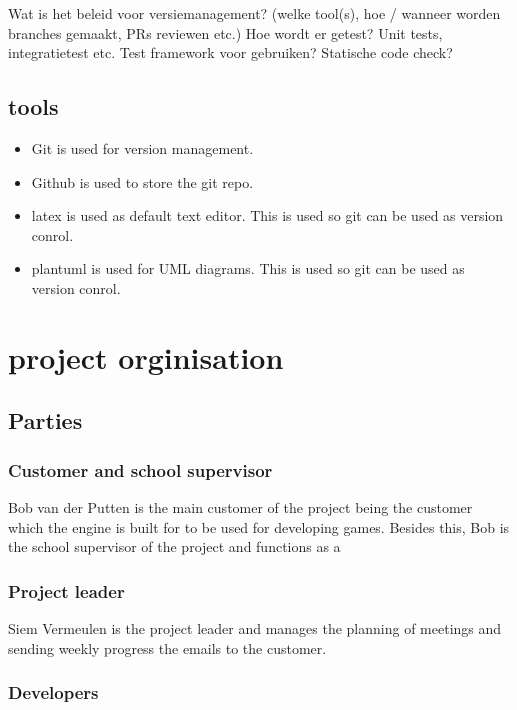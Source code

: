 \documentclass{article} %
\begin{document}
    Wat is het beleid voor versiemanagement? (welke tool(s), hoe / wanneer worden branches gemaakt, PRs reviewen etc.)
    Hoe wordt er getest? Unit tests, integratietest etc. Test framework voor gebruiken? Statische code check?
    \subsection{tools}
    \begin{itemize}
        \item Git is used for version management.
        \item Github is used to store the git repo.
        \item latex is used as default text editor. This is used so git can be used as version conrol.
        \item plantuml is used for UML diagrams. This is used so git can be used as version conrol.
        
    \end{itemize}
    \newpage

    \section{project orginisation}
    
    \subsection{Parties}
    
    \subsubsection{Customer and school supervisor}
    
    Bob van der Putten is the main customer of the project being the customer which the engine is built for to be used for developing games. Besides this, Bob is the school supervisor of the project and functions as a 
    
    \subsubsection{Project leader}
    
    Siem Vermeulen is the project leader and manages the planning of meetings and sending weekly progress the emails to the customer.
    
    \subsubsection{Developers}
    
\end{document}
